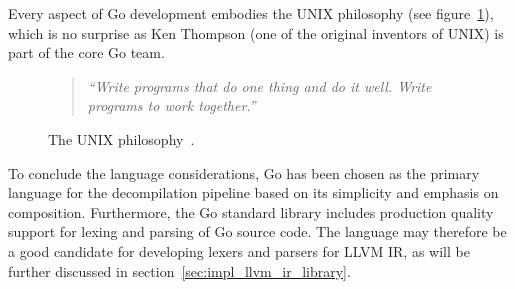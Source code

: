 Every aspect of Go development embodies the UNIX philosophy (see figure~\ref{fig:unix_philosophy}), which is no surprise as Ken Thompson (one of the original inventors of UNIX) is part of the core Go team.

\begin{figure}[htbp]
	\begin{center}
		\begin{quote}
			\textit{``Write programs that do one thing and do it well. Write programs to work together.''}
		\end{quote}
		\caption{The UNIX philosophy~\cite{art_of_unix}.}
		\label{fig:unix_philosophy}
	\end{center}
\end{figure}

To conclude the language considerations, Go has been chosen as the primary language for the decompilation pipeline based on its simplicity and emphasis on composition. Furthermore, the Go standard library includes production quality support for lexing and parsing of Go source code. The language may therefore be a good candidate for developing lexers and parsers for LLVM IR, as will be further discussed in section~\ref{sec:impl_llvm_ir_library}.

